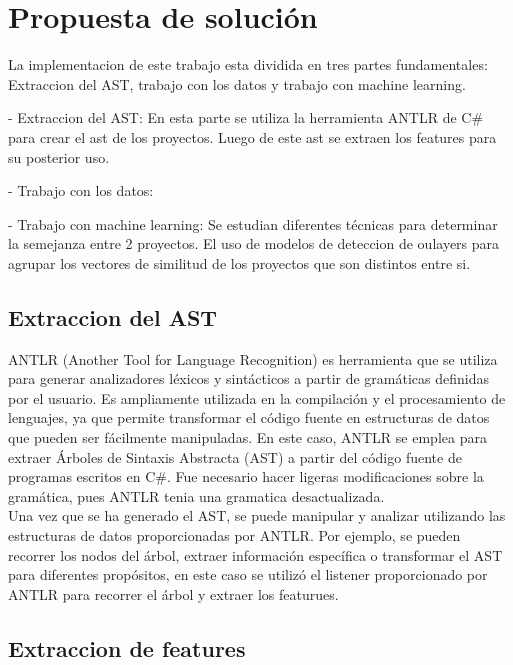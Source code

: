 \chapter{Propuesta de solución}\label{chapter:proposal}

La implementacion  de este trabajo esta dividida en tres partes fundamentales: Extraccion del AST, trabajo con los datos y trabajo con machine learning.

- Extraccion del AST: En esta parte se utiliza la herramienta ANTLR de C\# para crear el ast de los proyectos. Luego de este ast se extraen los features para su posterior uso.

- Trabajo con los datos: 

- Trabajo con machine learning: Se estudian diferentes técnicas para determinar la semejanza entre 2 proyectos. El uso de modelos de deteccion de oulayers para agrupar los vectores de similitud de los proyectos que son distintos entre si.


\section{Extraccion del AST}

ANTLR (Another Tool for Language Recognition) es herramienta que se utiliza para generar analizadores léxicos y sintácticos a partir de gramáticas definidas por el usuario. Es ampliamente utilizada en la compilación y el procesamiento de lenguajes, ya que permite transformar el código fuente en estructuras de datos que pueden ser fácilmente manipuladas. En este caso, ANTLR se emplea para extraer Árboles de Sintaxis Abstracta (AST) a partir del código fuente de programas escritos en C\#. Fue necesario hacer ligeras modificaciones sobre la gramática, pues ANTLR tenia una gramatica desactualizada. \\

Una vez que se ha generado el AST, se puede manipular y analizar utilizando las estructuras de datos proporcionadas por ANTLR. Por ejemplo, se pueden recorrer los nodos del árbol, extraer información específica o transformar el AST para diferentes propósitos, en este caso se utilizó el listener proporcionado por ANTLR para recorrer el árbol y extraer los featurues. \\

\section{Extraccion de features}

